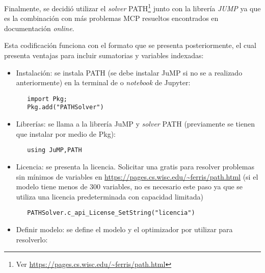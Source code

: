  Finalmente, se decidió utilizar el \textit{solver} PATH\footnote{Ver \url{https://pages.cs.wisc.edu/~ferris/path.html}} junto con la librería \textit{JUMP} ya que es la combinación con más problemas MCP resueltos encontrados en documentación \textit{online}.
 \vspace{2.5mm}
 
Esta codificación funciona con el formato que se presenta posteriormente, el cual presenta ventajas para incluir sumatorias y variables indexadas: 

\begin{itemize}
 
\item Instalación: se instala PATH (se debe instalar JuMP si no se a realizado anteriormente) en la terminal de \julia o \textit{notebook} de Jupyter:\\

\begin{footnotesize}
   \begin{lstlisting}
   import Pkg;
   Pkg.add("PATHSolver")
   \end{lstlisting}
   \end{footnotesize}


\item Librerías: se llama a la librería JuMP y \textit{solver} PATH (previamente se tienen que instalar por medio de Pkg):
   
   \begin{footnotesize}
   \begin{lstlisting}
   using JuMP,PATH
   \end{lstlisting}
   \end{footnotesize}
   
    \item Licencia: se presenta la licencia. Solicitar una gratis para resolver problemas sin mínimos de variables en \url{https://pages.cs.wisc.edu/~ferris/path.html} (si el modelo tiene menos de 300 variables, no es necesario este paso ya que se utiliza una licencia predeterminada con capacidad limitada)
    \begin{footnotesize}
   \begin{lstlisting}
   PATHSolver.c_api_License_SetString("licencia")
   \end{lstlisting}
   \end{footnotesize}
    
   \item Definir modelo: se define el modelo y el optimizador por utilizar para resolverlo:
   

\end{itemize}
